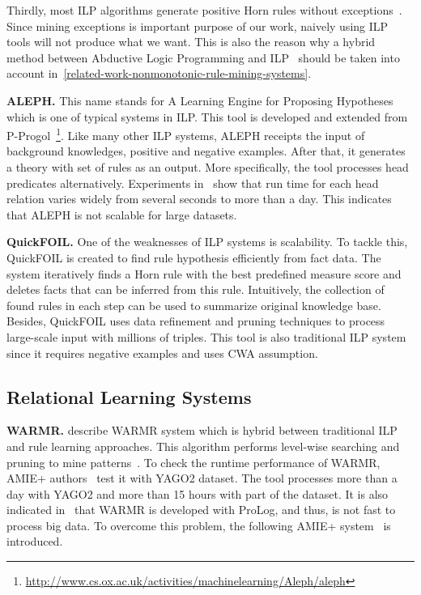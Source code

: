 Thirdly, most ILP algorithms generate positive Horn rules without exceptions~\cite{ref11}. Since mining exceptions is important purpose of our work, naively using ILP tools will not produce what we want. This is also the reason why a hybrid method between Abductive Logic Programming and ILP~\cite{ref11} should be taken into account in~\ref{related-work-nonmonotonic-rule-mining-systems}.

\textbf{ALEPH.} This name stands for A Learning Engine for Proposing Hypotheses which is one of typical systems in ILP. This tool is developed and extended from P-Progol~\footnote{\url{http://www.cs.ox.ac.uk/activities/machinelearning/Aleph/aleph}}. Like many other ILP systems, ALEPH receipts the input of background knowledges, positive and negative examples. After that, it generates a theory with set of rules as an output. More specifically, the tool processes head predicates alternatively. Experiments in~\cite{ref10} show that run time for each head relation varies widely from several seconds to more than a day. This indicates that ALEPH is not scalable for large datasets.

\textbf{QuickFOIL.} One of the weaknesses of ILP systems is scalability. To tackle this, QuickFOIL is created to find rule hypothesis efficiently from fact data. The system iteratively finds a Horn rule with the best predefined measure score and deletes facts that can be inferred from this rule. Intuitively, the collection of found rules in each step can be used to summarize original knowledge base. Besides, QuickFOIL uses data refinement and pruning techniques to process large-scale input with millions of triples. This tool is also traditional ILP system since it requires negative examples and uses CWA assumption.

\subsection{Relational Learning Systems}

\textbf{WARMR.} \cite{ref16, ref17} describe WARMR system which is hybrid between traditional ILP and rule learning approaches. This algorithm performs level-wise searching and pruning to mine patterns~\cite{ref10}. To check the runtime performance of WARMR, AMIE+ authors~\cite{ref10} test it with YAGO2 dataset. The tool processes more than a day with YAGO2 and more than 15 hours with part of the dataset. It is also indicated in~\cite{ref10} that WARMR is developed with ProLog, and thus, is not fast to process big data. To overcome this problem, the following AMIE+ system~\cite{ref10} is introduced.

